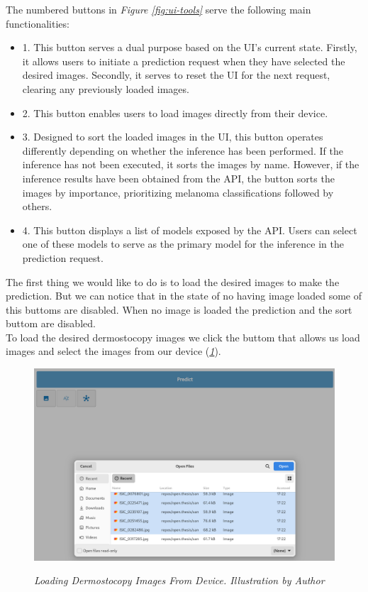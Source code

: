 The numbered buttons in \textit{Figure \ref{fig:ui-tools}} serve the following main functionalities:

\begin{itemize}
  \item 1. This button serves a dual purpose based on the UI's current state. Firstly, it allows users to initiate a prediction request when they have selected the desired images. Secondly, it serves to reset the UI for the next request, clearing any previously loaded images.
  \item 2. This button enables users to load images directly from their device.
  \item 3. Designed to sort the loaded images in the UI, this button operates differently depending on whether the inference has been performed. If the inference has not been executed, it sorts the images by name. However, if the inference results have been obtained from the API, the button sorts the images by importance, prioritizing melanoma classifications followed by others.
  \item 4. This button displays a list of models exposed by the API. Users can select one of these models to serve as the primary model for the inference in the prediction request.
\end{itemize}


The first thing we would like to do is to load the desired images to make the prediction.
But we can notice that in the state of no having image loaded some of this buttoms are disabled.
When no image is loaded the prediction and the sort buttom are disabled. \\

To load the desired dermostocopy images we click the buttom that allows us load images and select
the images from our device (\textit{\ref{fig:selecting-imgs}}).

\begin{figure}[H]
\centering
    \includegraphics[width=\textwidth]{imatges/results/selecting-images.png}
\caption[Loading Dermostocopy Images From Device]{\textit{Loading Dermostocopy Images From Device. Illustration by Author}}
{\label{fig:selecting-imgs}}
\end{figure}

